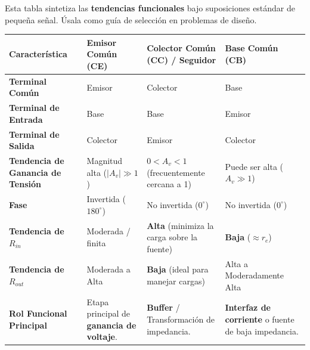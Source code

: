 \documentclass[11pt, a4paper]{article}
\begin{document}
\begin{tcolorbox}[colback=ucbblue!5, colframe=ucbblue, title=\textbf{Comparación Funcional de Configuraciones BJT}]
    Esta tabla sintetiza las \textbf{tendencias funcionales} bajo suposiciones estándar de pequeña señal. Úsala como guía de selección en problemas de diseño.
\end{tcolorbox}

\vspace{0.5cm}

\renewcommand{\arraystretch}{1.8}
\begin{tabularx}{\textwidth}{|>{\raggedright\arraybackslash}p{3.5cm}|>{\raggedright\arraybackslash}X|>{\raggedright\arraybackslash}X|>{\raggedright\arraybackslash}X|}
\hline
\rowcolor{ucbblue!20}
\textbf{Característica} & \textbf{Emisor Común (CE)} & \textbf{Colector Común (CC) / Seguidor} & \textbf{Base Común (CB)} \\ \hline
\textbf{Terminal Común} & Emisor & Colector & Base \\ \hline
\textbf{Terminal de Entrada} & Base & Base & Emisor \\ \hline
\textbf{Terminal de Salida} & Colector & Emisor & Colector \\ \hline
\textbf{Tendencia de Ganancia de Tensión} & Magnitud alta ($|A_v| \gg 1$) & $0 < A_v < 1$ (frecuentemente cercana a 1) & Puede ser alta ($A_v \gg 1$) \\ \hline
\textbf{Fase} & Invertida ($180^\circ$) & No invertida ($0^\circ$) & No invertida ($0^\circ$) \\ \hline
\textbf{Tendencia de $R_{in}$} & Moderada / finita & \textbf{Alta} (minimiza la carga sobre la fuente) & \textbf{Baja} ($\approx r_e$) \\ \hline
\textbf{Tendencia de $R_{out}$} & Moderada a Alta & \textbf{Baja} (ideal para manejar cargas) & Alta a Moderadamente Alta \\ \hline
\textbf{Rol Funcional Principal} & Etapa principal de \textbf{ganancia de voltaje}. & \textbf{Buffer} / Transformación de impedancia. & \textbf{Interfaz de corriente} o fuente de baja impedancia. \\ \hline
\end{tabularx}

\vspace{1cm}
\end{document}
